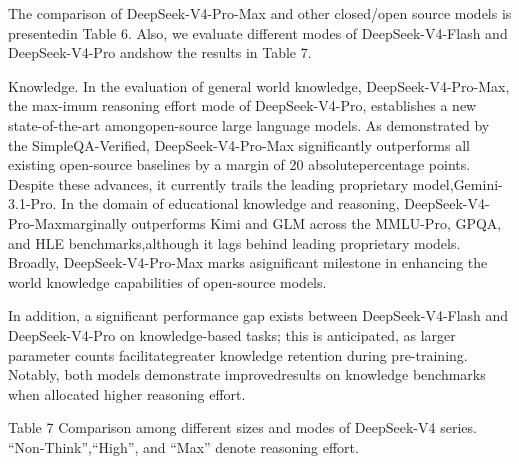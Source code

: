 \documentclass[
  10
]{article}
\begin{document}
The comparison of DeepSeek-V4-Pro-Max and other closed/open source
models is presentedin Table 6. Also, we evaluate different modes of
DeepSeek-V4-Flash and DeepSeek-V4-Pro andshow the results in Table 7.

Knowledge. In the evaluation of general world knowledge,
DeepSeek-V4-Pro-Max, the max-imum reasoning effort mode of
DeepSeek-V4-Pro, establishes a new state-of-the-art amongopen-source
large language models. As demonstrated by the SimpleQA-Verified,
DeepSeek-V4-Pro-Max significantly outperforms all existing open-source
baselines by a margin of 20 absolutepercentage points. Despite these
advances, it currently trails the leading proprietary
model,Gemini-3.1-Pro. In the domain of educational knowledge and
reasoning, DeepSeek-V4-Pro-Maxmarginally outperforms Kimi and GLM across
the MMLU-Pro, GPQA, and HLE benchmarks,although it lags behind leading
proprietary models. Broadly, DeepSeek-V4-Pro-Max marks asignificant
milestone in enhancing the world knowledge capabilities of open-source
models.

In addition, a significant performance gap exists between
DeepSeek-V4-Flash and DeepSeek-V4-Pro on knowledge-based tasks; this is
anticipated, as larger parameter counts facilitategreater knowledge
retention during pre-training. Notably, both models demonstrate
improvedresults on knowledge benchmarks when allocated higher reasoning
effort.

Table 7 \textbar{} Comparison among different sizes and modes of
DeepSeek-V4 series. ``Non-Think'',``High'', and ``Max'' denote reasoning
effort.
\end{document}
